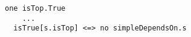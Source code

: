 \lstset{frame=tb, aboveskip=12pt, belowskip=-3pt, breaklines=true, basicstyle=\small\ttfamily, tabsize=2, mathescape=true}
\begin{lstlisting}[caption={facts.als, lines 17-41}, label=alloy:top, captionpos=b]
one isTop.True
    ...
  isTrue[s.isTop] <=> no simpleDependsOn.s
\end{lstlisting}